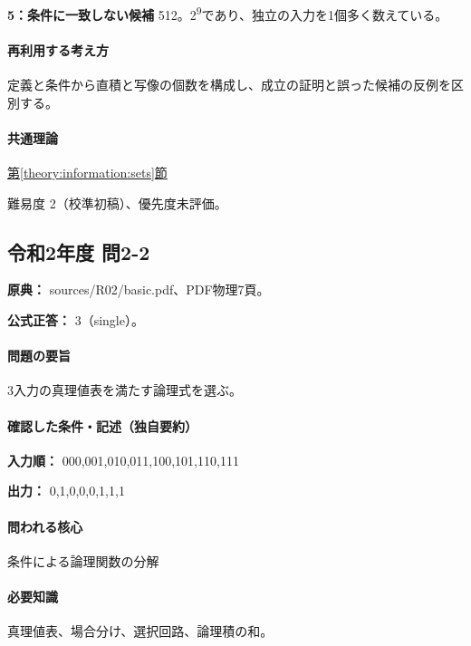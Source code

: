 \noindent\textbf{5：条件に一致しない候補} 512。2\textsuperscript{9}であり、独立の入力を1個多く数えている。\par

\paragraph{再利用する考え方} 定義と条件から直積と写像の個数を構成し、成立の証明と誤った候補の反例を区別する。

\paragraph{共通理論} \hyperref[theory:information:sets]{第\ref*{theory:information:sets}節}

\par 難易度 2（校準初稿）、優先度未評価。

\subsection{令和2年度 問2-2}
\label{q:r02-reg-basic-2-2}

\noindent\textbf{原典：} sources/R02/basic.pdf、PDF物理7頁。

\textbf{公式正答：} 3（single）。

\paragraph{問題の要旨} 3入力の真理値表を満たす論理式を選ぶ。

\paragraph{確認した条件・記述（独自要約）}\mbox{}\par

\noindent\textbf{入力順：} 000,001,010,011,100,101,110,111\par

\noindent\textbf{出力：} 0,1,0,0,0,1,1,1\par

\paragraph{問われる核心} 条件による論理関数の分解

\paragraph{必要知識} 真理値表、場合分け、選択回路、論理積の和。

